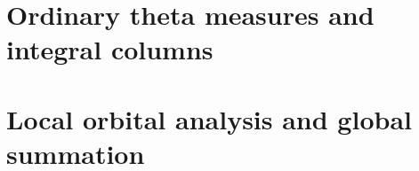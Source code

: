\part{Ordinary theta measures and integral columns}














\part{Local orbital analysis and global summation}











